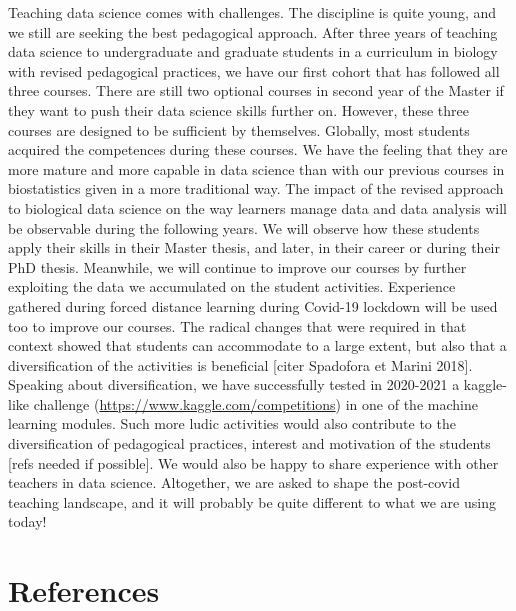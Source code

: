 \documentclass{aims}
\theoremstyle{definition}
\begin{document}
Teaching data science comes with challenges. The discipline is quite
young, and we still are seeking the best pedagogical approach. After
three years of teaching data science to undergraduate and graduate
students in a curriculum in biology with revised pedagogical practices,
we have our first cohort that has followed all three courses. There are
still two optional courses in second year of the Master if they want to
push their data science skills further on. However, these three courses
are designed to be sufficient by themselves. Globally, most students
acquired the competences during these courses. We have the feeling that
they are more mature and more capable in data science than with our
previous courses in biostatistics given in a more traditional way. The
impact of the revised approach to biological data science on the way
learners manage data and data analysis will be observable during the
following years. We will observe how these students apply their skills
in their Master thesis, and later, in their career or during their PhD
thesis. Meanwhile, we will continue to improve our courses by further
exploiting the data we accumulated on the student activities. Experience
gathered during forced distance learning during Covid-19 lockdown will
be used too to improve our courses. The radical changes that were
required in that context showed that students can accommodate to a large
extent, but also that a diversification of the activities is beneficial
{[}citer Spadofora et Marini 2018{]}. Speaking about diversification, we
have successfully tested in 2020-2021 a kaggle-like challenge
(\url{https://www.kaggle.com/competitions}) in one of the machine
learning modules. Such more ludic activities would also contribute to
the diversification of pedagogical practices, interest and motivation of
the students {[}refs needed if possible{]}. We would also be happy to
share experience with other teachers in data science. Altogether, we are
asked to shape the post-covid teaching landscape, and it will probably
be quite different to what we are using today!

\hypertarget{references}{%
\section*{References}\label{references}}
\end{document}
